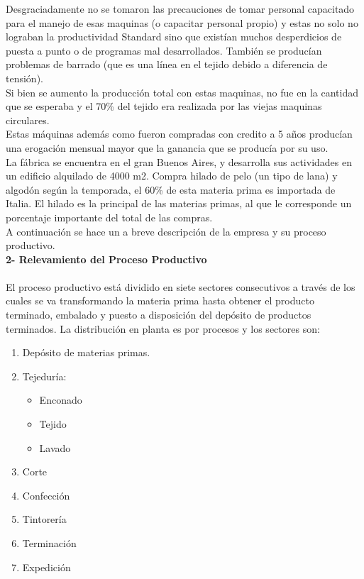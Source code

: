 \documentclass[a4paper,10pt,titlepage]{article}
\begin{document}
		\indent Desgraciadamente no se tomaron las precauciones de tomar personal capacitado para el manejo de esas maquinas (o capacitar personal propio) y estas no solo no lograban la productividad Standard sino que exist\'ian muchos desperdicios de puesta a punto o de programas mal desarrollados. Tambi\'en se produc\'ian problemas de barrado (que es una l\'inea en el tejido debido a diferencia de tensi\'on).\\
		\indent Si bien se aumento la producci\'on total con estas maquinas, no fue en la cantidad que se esperaba y el 70\% del tejido era realizada por las viejas maquinas circulares.\\
		\indent Estas m\'aquinas adem\'as como fueron compradas con credito a 5 años produc\'ian una erogaci\'on mensual mayor que la ganancia que se produc\'ia por su uso.\\
		\indent La f\'abrica se encuentra en el gran Buenos Aires, y desarrolla sus actividades en un edificio alquilado de 4000 m2. Compra hilado de pelo (un tipo de lana) y algod\'on seg\'un la temporada, el 60\% de esta materia prima es importada de Italia. El hilado es la principal de las materias primas, al que le corresponde un porcentaje importante del total de las compras.\\ 
		\indent A continuaci\'on se hace un a breve descripci\'on de la empresa y su proceso productivo.\\

	\vspace{0.5cm}
	 \textbf{2- Relevamiento del Proceso Productivo}\\ \\
		\indent El proceso productivo est\'a dividido en siete sectores consecutivos a trav\'es de los cuales se va transformando la materia prima hasta obtener el producto terminado, embalado y puesto a disposici\'on del dep\'osito de productos terminados. La distribuci\'on en planta es por procesos y los sectores son:\\
			\begin{enumerate}
			 \item Dep\'osito de materias primas.
			 \item Tejedur\'ia: 
				 \begin{itemize}
				 \item Enconado
 				 \item Tejido
 				 \item Lavado
				 \end{itemize}
 			 \item Corte
 			 \item Confecci\'on
 			 \item Tintorer\'ia
 			 \item Terminaci\'on
 			 \item Expedici\'on
			 \end{enumerate}
\end{document}
